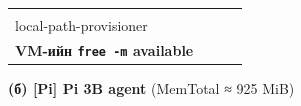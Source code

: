 \begin{longtable}[]{@{}llll@{}}
\begin{minipage}[t]{0.22\columnwidth}
\strut
\end{minipage} & \begin{minipage}[t]{0.22\columnwidth}\raggedright
\strut
\end{minipage}\tabularnewline
\begin{minipage}[t]{0.22\columnwidth}\raggedright
local-path-provisioner\strut
\end{minipage} & \begin{minipage}[t]{0.22\columnwidth}\raggedright
\strut
\end{minipage} & \begin{minipage}[t]{0.22\columnwidth}\raggedright
\strut
\end{minipage} & \begin{minipage}[t]{0.22\columnwidth}\raggedright
\strut
\end{minipage}\tabularnewline
\begin{minipage}[t]{0.22\columnwidth}\raggedright
\textbf{VM-ийн \texttt{free\ -m} available}\strut
\end{minipage} & \begin{minipage}[t]{0.22\columnwidth}\raggedright
\strut
\end{minipage} & \begin{minipage}[t]{0.22\columnwidth}\raggedright
\strut
\end{minipage} & \begin{minipage}[t]{0.22\columnwidth}\raggedright
\strut
\end{minipage}\tabularnewline
\bottomrule
\end{longtable}\endgroup

\textbf{(б) {[}Pi{]} Pi 3B agent} (MemTotal ≈ 925 MiB)

